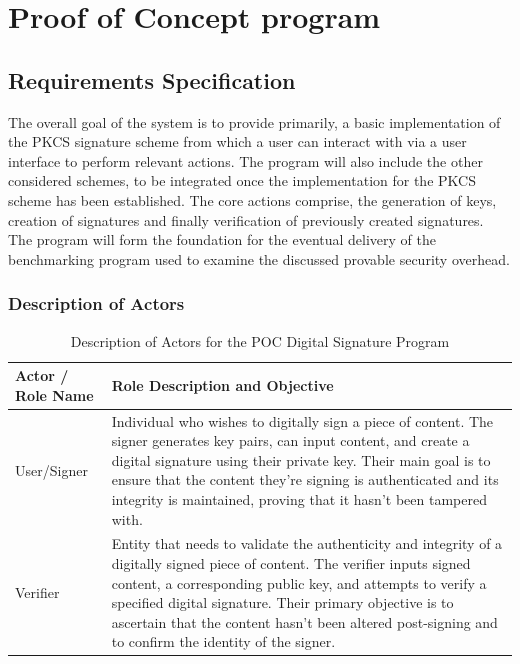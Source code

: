 \documentclass[]{final_report}
\theoremstyle{definition}
\begin{document}
\chapter{Proof of Concept program}
\section{Requirements Specification}
The overall goal of the system is to provide primarily, a basic implementation of the PKCS signature scheme from which a user can interact with via a user interface to perform relevant actions. The program will also include the other considered schemes, to be integrated once the implementation for the PKCS scheme has been established.
The core actions comprise, the generation of keys, creation of signatures and finally verification of previously created signatures. 
The program will form the foundation for the eventual delivery of the benchmarking program used to examine the discussed provable security overhead.

\subsection{Description of Actors}
\begin{table}[H]
    \centering
    \caption{Description of Actors for the POC Digital Signature Program}
    \label{tab:actors_description}
    \begin{tabular}{|l|p{10cm}|}
    \hline
    \textbf{Actor / Role Name} & \textbf{Role Description and Objective} \\
    \hline
    User/Signer & Individual who wishes to digitally sign a piece of content. The signer generates key pairs, can input content, and create a digital signature using their private key. Their main goal is to ensure that the content they're signing is authenticated and its integrity is maintained, proving that it hasn't been tampered with. \\
    \hline
    Verifier & Entity that needs to validate the authenticity and integrity of a digitally signed piece of content. The verifier inputs signed content, a corresponding public key, and attempts to verify a specified digital signature. Their primary objective is to ascertain that the content hasn't been altered post-signing and to confirm the identity of the signer. \\
    \hline
    \end{tabular}
\end{table}
\end{document}
